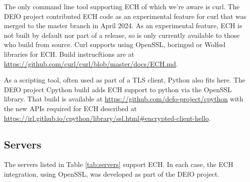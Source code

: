 The only command line tool supporting ECH of which we're aware is curl. The
DEfO project
contributed ECH code as an experimental feature for curl that was merged to the
master branch in April 2024. As an experimental feature, ECH is not built by
default nor part of a release, so is only currently available to those who
build from source. Curl supports using OpenSSL, boringssl or Wolfssl libraries
for ECH.  Build instrucftions are at
\url{https://github.com/curl/curl/blob/master/docs/ECH.md}.

As a scripting tool, often used as part of a TLS client, Python also fits here.
The DEfO project Cpython build adds ECH support to python via the OpenSSL
library.  That build is available at
\url{https://github.com/defo-project/cpython} with the new APIs required for
ECH described at
\url{https://irl.github.io/cpython/library/ssl.html#encrypted-client-hello}.

\subsection{Servers}

The servers listed in Table \ref{tab:servers} support ECH. In each case,
the ECH integration, using OpenSSL, was developed as part of the DEfO
project.

